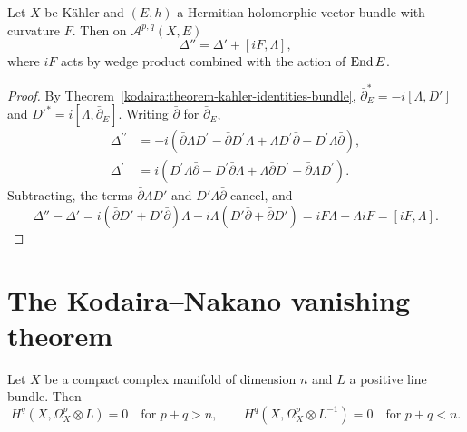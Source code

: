 \begin{theorem}\label{kodaira:theorem-nakano-identity}
Let $X$ be K\"ahler and $(E, h)$ a Hermitian holomorphic vector bundle with curvature $F$. Then on $\mathcal{A}^{p,q}(X, E)$
\[
\Delta'' = \Delta' + [iF, \Lambda],
\]
where $iF$ acts by wedge product combined with the action of $\operatorname{End} E$.
\end{theorem}

\begin{proof}
By Theorem~\ref{kodaira:theorem-kahler-identities-bundle}, $\bar\partial_E^* = -i[\Lambda, D']$ and $D'^* = i[\Lambda, \bar\partial_E]$. Writing
$\bar\partial$ for $\bar\partial_E$,
\[
\begin{aligned}
\Delta^{\prime\prime} &= -i\left(\bar\partial\Lambda D^{\prime} - \bar\partial D^{\prime}\Lambda + \Lambda D^{\prime}\bar\partial - D^{\prime}\Lambda\bar\partial\right), \\
\Delta^{\prime} &= i\left(D^{\prime}\Lambda\bar\partial - D^{\prime}\bar\partial\Lambda + \Lambda\bar\partial D^{\prime} - \bar\partial\Lambda D^{\prime}\right).
\end{aligned}
\]
Subtracting, the terms $\bar\partial\Lambda D'$ and $D'\Lambda\bar\partial$ cancel, and
\[
\Delta'' - \Delta' = i(\bar\partial D' + D'\bar\partial)\Lambda - i\Lambda(D'\bar\partial + \bar\partial D') = iF\Lambda - \Lambda iF = [iF, \Lambda] .
\]
\end{proof}

\section{The Kodaira--Nakano vanishing theorem}\label{kodaira:section-vanishing}

\begin{theorem}\label{kodaira:theorem-kodaira-nakano}
Let $X$ be a compact complex manifold of dimension $n$ and $L$ a positive line bundle. Then
\[
H^q(X, \Omega^p_X \otimes L) = 0 \quad \text{for } p + q > n, \qquad H^q(X, \Omega^p_X \otimes L^{-1}) = 0 \quad \text{for } p + q < n .
\]
\end{theorem}

